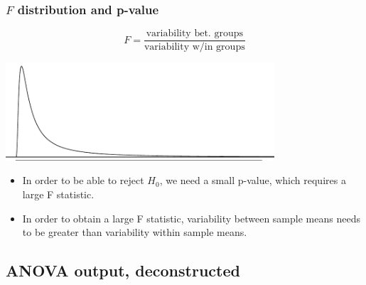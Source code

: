 
%
%
%
%
%
%
%

\begin{frame}
\frametitle{$F$ distribution and p-value}

\[ F =  \frac{\text{variability bet. groups}}{\text{variability w/in groups}} \]

\vspace{-1cm}

\begin{center}
\includegraphics[width=0.75\textwidth]{7-5_anova/figures/fdist/fdist}
\end{center}

\begin{itemize}

\item In order to be able to reject $H_0$, we need a small p-value, which requires a large F statistic.

\item In order to obtain a large F statistic, variability between sample means needs to be greater than variability within sample means.

\end{itemize}

\end{frame}


\subsection{ANOVA output, deconstructed}


